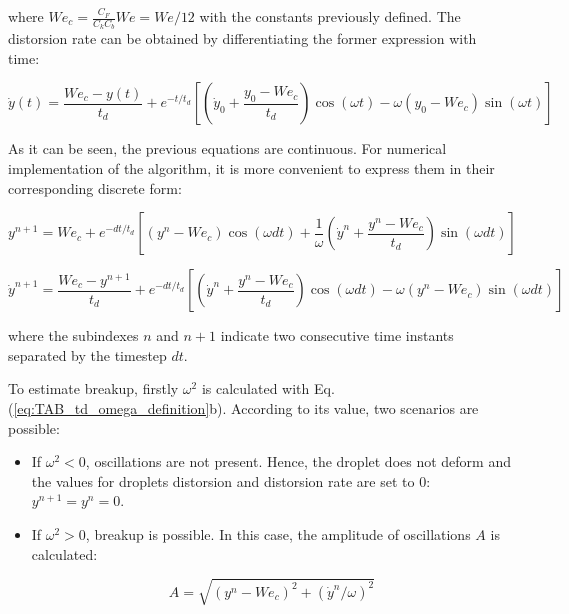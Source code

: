 where $We_c = \frac{C_F}{C_k C_b} We = We / 12$ with the constants previously defined. The distorsion rate can be obtained by differentiating the former expression with time:

\begin{equation}
\label{eq:dydtTAB_equation_general}
\dot{y} \left( t \right) = \frac{We_c - y \left( t \right) }{t_d} + e^{- t / t_d} \left[ \left( \dot{y}_0 + \frac{y_0 - We_c}{t_d} \right) \cos \left( \omega t \right) - \omega \left( y_0 - We_c \right) \sin \left( \omega t \right)  \right]
\end{equation}

As it can be seen, the previous equations are continuous. For numerical implementation of the algorithm, it is more convenient to express them in their corresponding discrete form:

\begin{equation}
\label{eq:yTAB_equation_discrete}
y^{n+1} = We_c + e^{- dt / t_d} \left[ \left( y^n - We_c \right) \cos \left( \omega dt \right) + \frac{1}{\omega}\left( \dot{y}^n + \frac{y^n - We_c}{t_d} \right) \sin \left( \omega dt \right)   \right]
\end{equation}

\begin{equation}
\label{eq:dydtTAB_equation_discrete}
\dot{y}^{n+1} = \frac{We_c - y^{n+1} }{t_d} + e^{- dt / t_d} \left[ \left( \dot{y}^n + \frac{y^n - We_c}{t_d} \right) \cos \left( \omega dt \right) - \omega \left( y^n - We_c \right) \sin \left( \omega dt \right)  \right]
\end{equation}

where the subindexes $n$ and $n+1$ indicate two consecutive time instants separated by the timestep $dt$.

To estimate breakup, firstly $\omega^2$ is calculated with Eq. (\ref{eq:TAB_td_omega_definition}b). According to its value, two scenarios are possible:

\begin{itemize}

	\item If $\omega^2 < 0$, oscillations are not present. Hence, the droplet does not deform and the values for droplets distorsion and distorsion rate are set to $0$: $y^{n+1} = y^n = 0$.
	
	\item If $\omega^2 > 0$, breakup is possible. In this case, the amplitude of oscillations $A$ is calculated:
	
	\begin{equation}
	A = \sqrt{\left( y^n - We_c \right)^2 + \left( \dot{y}^n / \omega \right)^2}
	\end{equation}

\end{itemize}


